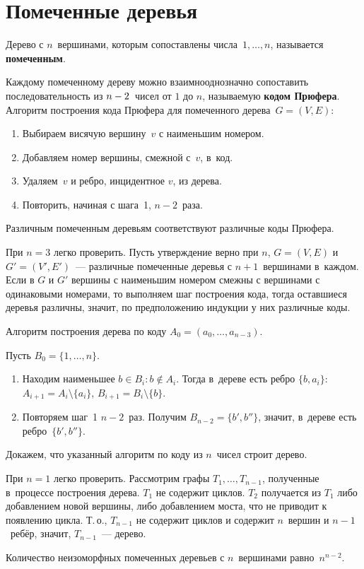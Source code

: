 \section{Помеченные деревья}
 Дерево с $n$~вершинами, которым сопоставлены числа~$1, \ldots, n$, называется \textbf{помеченным}.

 Каждому помеченному дереву можно взаимнооднозначно сопоставить последовательность из $n \opbr- 2$~чисел от $1$ до $n$, называемую \textbf{кодом Прюфера}.
Алгоритм построения кода Прюфера для помеченного дерева~$G = (V, E)$:
\begin{enumerate}
	\item Выбираем висячую вершину~$v$ с наименьшим номером.
	\item Добавляем номер вершины, смежной с~$v$, в~код.
	\item Удаляем~$v$ и ребро, инцидентное $v$, из дерева.
	\item Повторить, начиная с шага~1, $n - 2$~раза.
\end{enumerate}

\begin{statement}
Различным помеченным деревьям соответствуют различные коды Прюфера.
\end{statement}
\begin{proofmathind}
	\indbase При $n = 3$ легко проверить.
	\indstep Пусть утверждение верно при $n$, $G = (V, E)$ и $G' = (V', E')$~--- различные помеченные деревья с $n + 1$~вершинами в~каждом.
	Если в $G$ и $G'$ вершины с наименьшим номером смежны с вершинами с одинаковыми номерами, то выполняем шаг построения кода, тогда оставшиеся деревья различны, значит, по предположению индукции у них различные коды. \indend
\end{proofmathind}

Алгоритм построения дерева по коду $A_0 = (a_0, \ldots, a_{n-3})$.

Пусть $B_0 = \{ 1, \ldots, n \}$.
\begin{enumerate}
	\item Находим наименьшее $b \in B_i \colon b \notin A_i$.
	Тогда в~дереве есть ребро $\{ b, a_i \}$: $A_{i+1} = A_i \setminus \{ a_i \}$, $B_{i+1} = B_i \setminus \{ b \}$.
	\item Повторяем шаг~1 $n - 2$~раз.
	Получим $B_{n-2} = \{ b', b'' \}$, значит, в~дереве есть ребро~$\{ b', b'' \}$.
\end{enumerate}

Докажем, что указанный алгоритм по коду из $n$~чисел строит дерево.
\begin{proofmathind}
	\indbase При $n = 1$ легко проверить.
	\indstep Рассмотрим графы $T_1, \ldots, T_{n-1}$, полученные в~процессе построения дерева.
	$T_1$ не содержит циклов.
	$T_2$ получается из $T_1$ либо добавлением новой вершины, либо добавлением моста, что не приводит к появлению цикла.	
	Т.\,о., $T_{n-1}$ не содержит циклов и содержит $n$~вершин и $n - 1$~ребёр, значит, $T_{n-1}$~--- дерево.
	\indend
\end{proofmathind}

\begin{theorem}[Кэли]
Количество неизоморфных помеченных деревьев с $n$~вершинами равно~$n^{n-2}$.
\end{theorem}